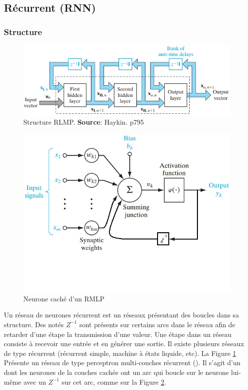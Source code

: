 \subsection{Récurrent (RNN)}
\subsubsection*{Structure}
\begin{figure}
 \centering
 \includegraphics[scale=0.5]{../figures/structurermlp.jpg}
 \caption{Structure RLMP. \textbf{Source}: Haykin. p795\cite{Haykin}}
 \label{structurermlp}
\end{figure}
\begin{figure}
 \centering
 \includegraphics[scale=0.5]{../figures/neuronermlp.jpg}
 \caption{Neurone caché d'un RMLP}
 \label{neuronermlp}
\end{figure}
Un réseau de neurones récurrent est un réseaux présentant des boucles dans sa structure.
Des  notés $Z^{-1}$ sont présents sur certains arcs dans le réseau afin de retarder d'une étape la transmission d'une valeur.
Une étape dans un réseau consiste à recevoir une entrée et en générer une sortie.
Il existe plusieurs réseaux de type récurrent (récurrent simple, machine à états liquide, etc).
La Figure \ref{structurermlp} Présente un réseau de type perceptron multi-couches récurrent (\rmlp).
Il s'agit d'un \mlp dont les neurones de la couches cachée ont un arc qui boucle sur le neurone lui-même avec un $Z^{-1}$ sur cet arc, comme sur la Figure \ref{neuronermlp}.
